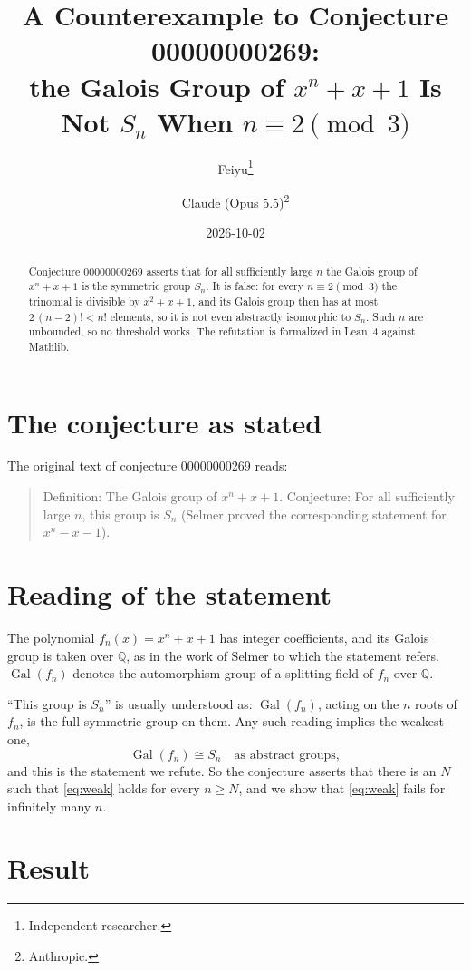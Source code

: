 \documentclass[11pt]{article}
\title{A Counterexample to Conjecture 00000000269:\\
the Galois Group of $x^n+x+1$ Is Not $S_n$ When $n\equiv2\pmod 3$}
\author{%
  Feiyu\thanks{Independent researcher.}
  \and
  Claude (Opus 5.5)\thanks{Anthropic.}%
}
\date{2026-10-02}
\theoremstyle{plain}
\theoremstyle{remark}
\DeclareMathOperator{\Gal}{Gal}
\begin{document}
\maketitle

\begin{abstract}
Conjecture 00000000269 asserts that for all sufficiently large $n$ the Galois
group of $x^n+x+1$ is the symmetric group $S_n$. It is false: for every
$n\equiv2\pmod3$ the trinomial is divisible by $x^2+x+1$, and its Galois group
then has at most $2\,(n-2)!<n!$ elements, so it is not even abstractly
isomorphic to $S_n$. Such $n$ are unbounded, so no threshold works. The
refutation is formalized in Lean~4 against Mathlib.
\end{abstract}

\section{The conjecture as stated}

The original text of conjecture 00000000269 reads:

\begin{quote}
Definition: The Galois group of $x^n + x + 1$. Conjecture: For all
sufficiently large $n$, this group is $S_n$ (Selmer proved the corresponding
statement for $x^n - x - 1$).
\end{quote}

\section{Reading of the statement}

The polynomial $f_n(x)=x^n+x+1$ has integer coefficients, and its Galois group
is taken over $\mathbb Q$, as in the work of Selmer to which the statement
refers. $\Gal(f_n)$ denotes the automorphism group of a splitting field of
$f_n$ over $\mathbb Q$.

``This group is $S_n$'' is usually understood as: $\Gal(f_n)$, acting on the $n$
roots of $f_n$, is the full symmetric group on them. Any such reading implies
the weakest one,
\begin{equation}\label{eq:weak}
  \Gal(f_n)\cong S_n\quad\text{as abstract groups},
\end{equation}
and this is the statement we refute. So the conjecture asserts that there is an
$N$ such that \eqref{eq:weak} holds for every $n\ge N$, and we show that
\eqref{eq:weak} fails for infinitely many $n$.

\section{Result}
\end{document}
